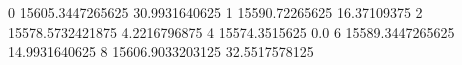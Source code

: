 0 15605.3447265625 30.9931640625
1 15590.72265625 16.37109375
2 15578.5732421875 4.2216796875
4 15574.3515625 0.0
6 15589.3447265625 14.9931640625
8 15606.9033203125 32.5517578125
